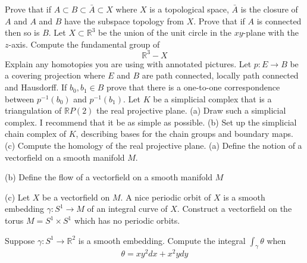 \documentclass[14pt]{extarticle}
\begin{document}
 Prove that if $A \subset B \subset \bar{A} \subset X$ where $X$ is a topological space, $\bar{A}$ is the closure of $A$ and $A$ and $B$ have the subspace topology from $X$. Prove that if $A$ is connected then so is $B$.
\newpage
 Let $X \subset \mathbb{R}^{3}$ be the union of the unit circle in the $x y$-plane with the $z$-axis. Compute the fundamental group of
$$
\mathbb{R}^{3}-X
$$
Explain any homotopies you are using with annotated pictures.
\newpage
Let $p: E \rightarrow B$ be a covering projection where $E$ and $B$ are path connected, locally path connected and Hausdorff. If $b_{0}, b_{1} \in B$ prove that there is a one-to-one correspondence between $p^{-1}\left(b_{0}\right)$ and $p^{-1}\left(b_{1}\right)$.
\newpage
Let $K$ be a simplicial complex that is a triangulation of $\mathbb{R} P(2)$ the real projective plane.
(a) Draw such a simplicial complex. I recommend that it be as simple as possible.
(b) Set up the simplicial chain complex of $K$, describing bases for the chain groups and boundary maps.
(c) Compute the homology of the real projective plane.
\newpage
(a) Define the notion of a vectorfield on a smooth manifold $M$.

(b) Define the flow of a vectorfield on a smooth manifold $M$

(c) Let $X$ be a vectorfield on $M$. A nice periodic orbit of $X$ is a smooth embedding $\gamma: S^{1} \rightarrow M$ of an integral curve of $X$. Construct a vectorfield on the torus $M=S^{1} \times S^{1}$ which has no periodic orbits.

\newpage
Suppose $\gamma: S^{1} \rightarrow \mathbb{R}^{2}$ is a smooth embedding. Compute the integral $\int_{\gamma} \theta$ when
$$
\theta=x y^{2} d x+x^{2} y d y
$$
\end{document}
